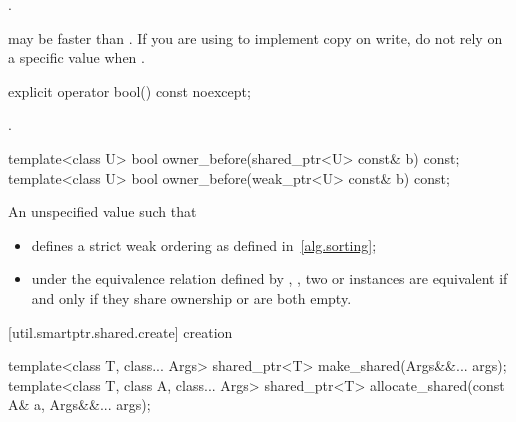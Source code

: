 \begin{itemdescr}
\pnum\returns  {}.

\pnum \enternote {} may be faster than .  If you are
using  to implement copy on write, do not rely on a
specific value when . \exitnote
\end{itemdescr}

%
%
\begin{itemdecl}
explicit operator bool() const noexcept;
\end{itemdecl}

\begin{itemdescr}
\pnum\returns {}.
\end{itemdescr}

%
%
\begin{itemdecl}
template<class U> bool owner_before(shared_ptr<U> const& b) const;
template<class U> bool owner_before(weak_ptr<U> const& b) const;
\end{itemdecl}

\begin{itemdescr}
\pnum
\returns An unspecified value such that

\begin{itemize}
\item {} defines a strict weak ordering as defined in~\ref{alg.sorting};

\item under the equivalence relation defined by ,
, two  or
 instances are equivalent if and only if they share ownership or
are both empty.
\end{itemize}

\end{itemdescr}


[util.smartptr.shared.create]{ creation}

%
%
\begin{itemdecl}
template<class T, class... Args> shared_ptr<T> make_shared(Args&&... args);
template<class T, class A, class... Args>
  shared_ptr<T> allocate_shared(const A& a, Args&&... args);
\end{itemdecl}


